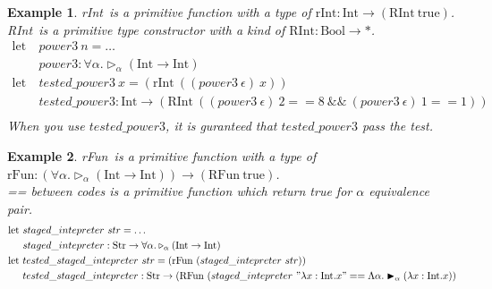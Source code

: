 \documentclass[9pt, a4paper]{extarticle}
\theoremstyle{break}
\newtheorem{ex}{Example}
\newcommand{\TW}{\triangleright}
\newcommand{\TB}{\blacktriangleright}
\begin{document}
\fi

\begin{ex}
	\newcommand{\I}{\textrm{Int}}
	\newcommand{\B}{\textrm{Bool}}
	\newcommand{\RI}{\textrm{RInt}}
	\newcommand{\rI}{\textrm{rInt}}
	\rI\ is a primitive function with a type of $\rI : \I \to (\RI\ \text{true})$.\\
	\RI\ is a primitive type constructor with a kind of $\RI : \B \to *$.
	\begin{align*}
		\text{let}\  & power3\ n = \hdots                                                                            \\
		             & power3 : \forall\alpha. \TW_\alpha(\I \to \I)                                                 \\
		\text{let}\  & tested\_power3\ x = (\rI\ ((power3\ \epsilon)\ x))                                            \\
		             & tested\_power3 : \I \to (\RI\ ((power3\ \epsilon)\ 2 == 8\ \&\&\ (power3\ \epsilon)\ 1 == 1)) \\
	\end{align*}
	When you use $tested\_power3$, it is guranteed that $tested\_power3$ pass the test.
\end{ex}

\begin{ex}
	\newcommand{\I}{\textrm{Int}}
	\newcommand{\Exp}{\textrm{Str}}
	\newcommand{\RI}{\textrm{RFun}}
	\newcommand{\rI}{\textrm{rFun}}
	\rI\ is a primitive function with a type of $\rI : (\forall\alpha.\TW_\alpha(\I \to \I)) \to (\RI\ \text{true})$.\\
	== between codes is a primitive function which return true for $\alpha$ equivalence pair.
	\begin{align*}
		\text{let}\  & staged\_intepreter\ str = \hdots                                                                                                \\
		             & staged\_intepreter : \Exp \to \forall\alpha.\TW_\alpha(\I \to \I)                                                               \\
		\text{let}\  & tested\_staged\_intepreter\ str = (\rI\ (staged\_intepreter\ str))                                                              \\
		             & tested\_staged\_intepreter : \Exp \to (\RI\ (staged\_intepreter\ "\lambda x:\I.x" == \Lambda\alpha.\TB_\alpha (\lambda x:\I.x)) \\
	\end{align*}
\end{ex}
\end{document}
